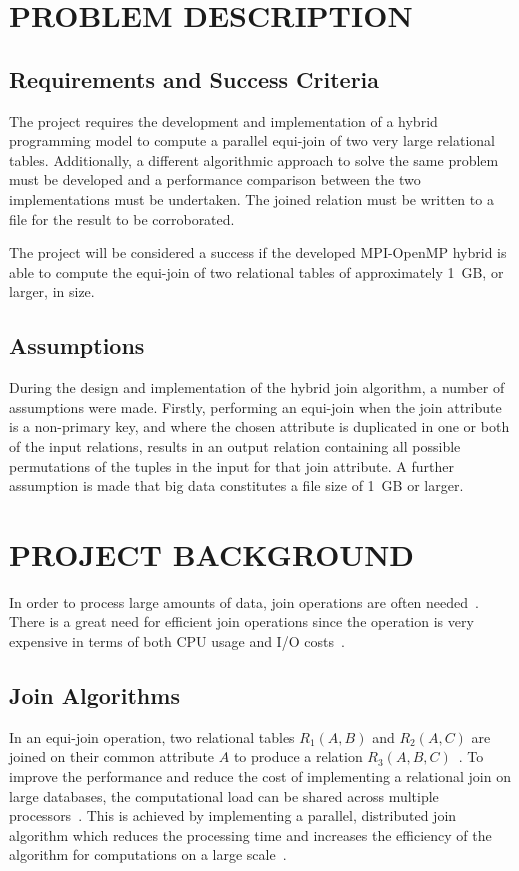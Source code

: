\documentclass[12pt,twocolumn]{witseiepaper}
\begin{document}
\section{PROBLEM DESCRIPTION}

\subsection{Requirements and Success Criteria}

The project requires the development and implementation of a hybrid programming model to compute a parallel equi-join of two very large relational tables. Additionally, a different algorithmic approach to solve the same problem must be developed and a performance comparison between the two implementations must be undertaken. The joined relation must be written to a file for the result to be corroborated.

The project will be considered a success if the developed MPI-OpenMP hybrid is able to compute the equi-join of two relational tables of approximately 1~GB, or larger, in size.

\subsection{Assumptions}

During the design and implementation of the hybrid join algorithm, a number of assumptions were made. Firstly, performing an equi-join when the join attribute is a non-primary key, and where the chosen attribute is duplicated in one or both of the input relations, results in an output relation containing all possible permutations of the tuples in the input for that join attribute. A further assumption is made that big data constitutes a file size of 1~GB or larger. 

\section{PROJECT BACKGROUND}
In order to process large amounts of data, join operations are often needed~\cite{mapReduceJoin}. There is a great need for efficient join operations since the operation is very expensive in terms of both CPU usage and I/O costs~\cite{mapReduceJoin}.

\subsection{Join Algorithms}

In an equi-join operation, two relational tables $R_1(A,B)$ and $R_2(A,C)$ are joined on their common attribute $A$ to produce a relation $R_3(A,B,C)$~\cite{thomas_zurek_optimisation_1997}. To improve the performance and reduce the cost of implementing a relational join on large databases, the computational load can be shared across multiple processors~\cite{thomas_zurek_optimisation_1997}. This is achieved by implementing a parallel, distributed join algorithm which reduces the processing time and increases the efficiency of the algorithm for computations on a large scale~\cite{thomas_zurek_optimisation_1997}.
\end{document}
